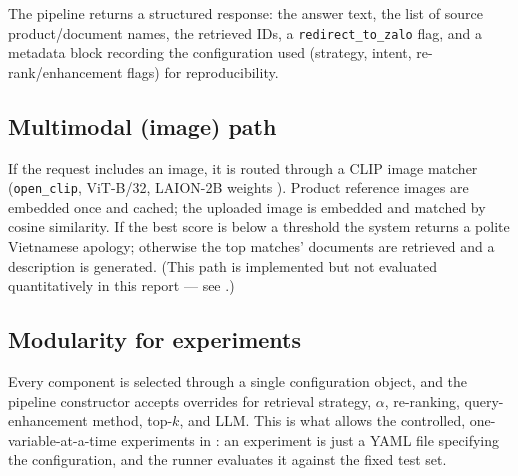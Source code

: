 The pipeline returns a structured response: the answer text, the list of source
product/document names, the retrieved IDs, a \texttt{redirect\_to\_zalo} flag,
and a metadata block recording the configuration used (strategy, intent,
re-rank/enhancement flags) for reproducibility.

\subsection{Multimodal (image) path}
If the request includes an image, it is routed through a CLIP image matcher
(\texttt{open\_clip}, ViT-B/32, LAION-2B weights \cite{radford2021clip}). Product
reference images are embedded once and cached; the uploaded image is embedded
and matched by cosine similarity. If the best score is below a threshold the
system returns a polite Vietnamese apology; otherwise the top matches' documents
are retrieved and a description is generated. (This path is implemented but not
evaluated quantitatively in this report --- see .)

\subsection{Modularity for experiments}
Every component is selected through a single configuration object, and the
pipeline constructor accepts overrides for retrieval strategy, $\alpha$,
re-ranking, query-enhancement method, top-$k$, and LLM. This is what allows the
controlled, one-variable-at-a-time experiments in : an
experiment is just a YAML file specifying the configuration, and the runner
evaluates it against the fixed test set.

